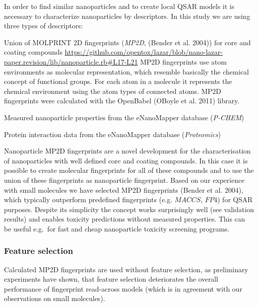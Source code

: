 \documentclass[utf8]{frontiersHLTH} %
\makeatletter
\providecommand{\tightlist}{%
  \setlength{\itemsep}{0pt}\setlength{\parskip}{0pt}}
\newenvironment{description}
	{\list{}{\labelwidth\z@ \itemindent-\leftmargin
		\let\makelabel\descriptionlabel}}
	{\endlist}
\newcommand*\descriptionlabel[1]{\hspace\labelsep
	\normalfont\bfseries #1}
\makeatother
\begin{document}
In order to find similar nanoparticles and to create local QSAR models
it is necessary to characterize nanoparticles by descriptors. In this
study we are using three types of descriptors:

\begin{description}
\tightlist
\item[Structural descriptors]
Union of MOLPRINT 2D fingerprints (\emph{MP2D}, (Bender et al. 2004))
for core and coating compounds
\url{https://github.com/opentox/lazar/blob/nano-lazar-paper.revision/lib/nanoparticle.rb\#L17-L21}
MP2D fingerprints use atom environments as molecular representation,
which resemble basically the chemical concept of functional groups. For
each atom in a molecule it represents the chemical environment using the
atom types of connected atoms. MP2D fingerprints were calculated with
the OpenBabel (OBoyle et al. 2011) library.
\item[Physico-chemical nanoparticle properties]
Measured nanoparticle properties from the eNanoMapper database
(\emph{P-CHEM})
\item[Biological nanoparticle properties]
Protein interaction data from the eNanoMapper database
(\emph{Proteomics})
\end{description}

Nanoparticle MP2D fingerprints are a novel development for the
characterisation of nanoparticles with well defined core and coating
compounds. In this case it is possible to create molecular fingerprints
for all of these compounds and to use the union of these fingerprints as
nanoparticle fingerprint. Based on our experience with small molecules
we have selected MP2D fingerprints (Bender et al. 2004), which typically
outperform predefined fingerprints (e.g. \(MACCS\), \(FP4\)) for QSAR
purposes. Despite its simplicity the concept works surprisingly well
(see validation results) and enables toxicity predictions without
measured properties. This can be useful e.g.~for fast and cheap
nanoparticle toxicity screening programs.

\subsubsection{Feature selection}\label{feature-selection}

Calculated MP2D fingerprints are used without feature selection, as
preliminary experiments have shown, that feature selection deteriorates
the overall performance of fingerprint read-across models (which is in
agreement with our observations on small molecules).
\end{document}
